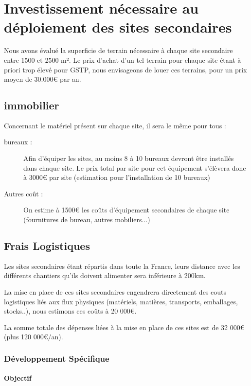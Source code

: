 \section{Investissement nécessaire au déploiement des sites secondaires}

    Nous avons évalué la superficie de terrain nécessaire à chaque site secondaire entre 1500 et 2500 m². Le prix d'achat d'un tel terrain pour chaque site étant à priori trop élevé pour GSTP, nous envisageons de louer ces terrains, pour un prix moyen de 30.000€ par an.

    \subsection{immobilier}

        Concernant le matériel présent sur chaque site, il sera le même pour tous : 
        \begin{description}
	        \item[bureaux : ] Afin d'équiper les sites, au moins 8 à 10 bureaux devront être installés dans chaque site. Le prix total par site pour cet équipement s'élèvera donc à 3000€ par site (estimation pour l'installation de 10 bureaux)
	        \item[Autres coût :]  On estime à 1500€ les coûts d'équipement secondaires de chaque site (fournitures de bureau, autres mobiliers...)
        \end{description}

        \subsection{Frais Logistiques}
        Les sites secondaires étant répartis dans toute la France, leurs distance avec les différents chantiers qu'ils doivent alimenter sera inférieure à 200km.

        La mise en place de ces sites secondaires engendrera directement des couts logistiques liés aux flux physiques (matériels, matières, transports, emballages, stocks..), nous estimons ces coûts à 20 000€.

        La somme totale des dépenses liées à la mise en place de ces sites est de 32 000€ (plus 120 000€/an).


        \subsubsection{Développement Spécifique}
        \paragraph{Objectif}

